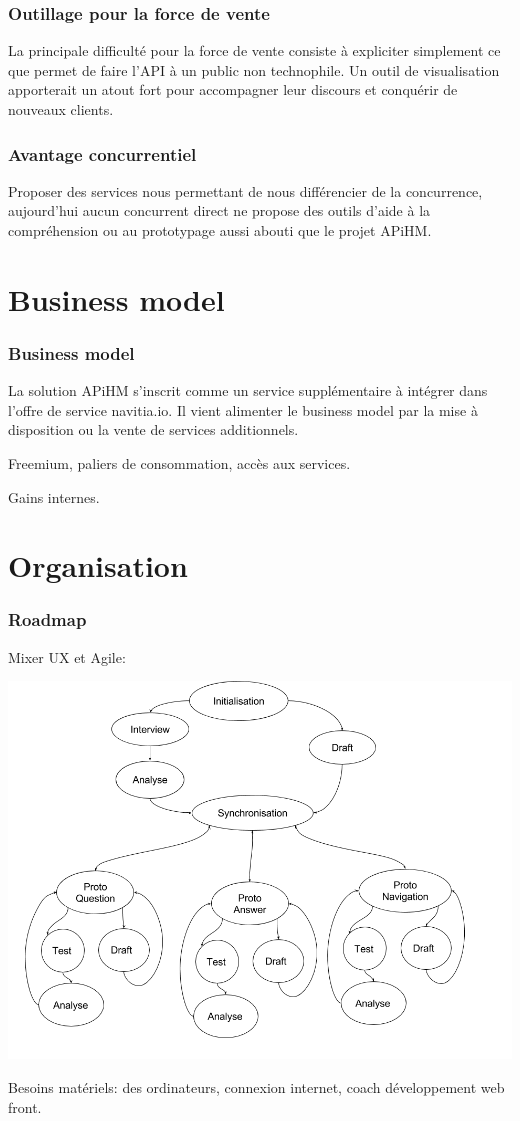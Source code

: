 \documentclass[table]{beamer}
\begin{document}
\begin{frame}
  \frametitle{Outillage pour la force de vente}

  La principale difficulté pour la force de vente consiste à
  expliciter simplement ce que permet de faire l'API à un public non
  technophile. Un outil de visualisation apporterait un atout fort
  pour accompagner leur discours et conquérir de nouveaux clients.
\end{frame}

\begin{frame}
  \frametitle{Avantage concurrentiel}

  Proposer des services nous permettant de nous différencier de la
  concurrence, aujourd'hui aucun concurrent direct ne propose des
  outils d'aide à la compréhension ou au prototypage aussi abouti que
  le projet APiHM.
\end{frame}

\section{Business model}

\begin{frame}
  \frametitle{Business model}

  La solution APiHM s'inscrit comme un service supplémentaire à
  intégrer dans l'offre de service navitia.io. Il vient alimenter le
  business model par la mise à disposition ou la vente de services
  additionnels.

  Freemium, paliers de consommation, accès aux services.

  Gains internes.
\end{frame}

\section{Organisation}

\begin{frame}
  \frametitle{Roadmap}

  Mixer UX et Agile:

  {\centering\includegraphics[width=0.7\linewidth]{images/roadmap}

  }

  Besoins matériels: des ordinateurs, connexion internet, coach
  développement web front.
\end{frame}
\end{document}
